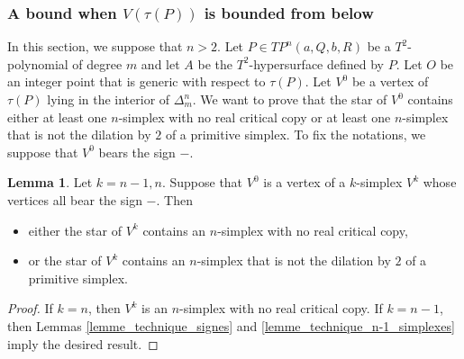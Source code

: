 \documentclass[12pt]{article}
\newcommand\customleq{\stackrel{\mathclap{\normalfont\scriptsize\mbox{n}}}{\leq}}
\theoremstyle{definition}
\newtheorem{lem}{Lemma}[section]
\newtheorem{rmk}{Remark}[section]
\begin{document}


\subsubsection{A bound when $V(\tau(P))$ is bounded from below}

\begin{sloppypar}
    In this section, we suppose that $n>2$. Let $P \in TP^n(a,Q,b,R)$ be a $T^2$-polynomial of degree $m$ and let $A$ be the $T^2$-hypersurface defined by $P$. Let $O$ be an integer point that is generic with respect to $\tau(P)$. Let $V^0$ be a vertex of $\tau(P)$ lying in the interior of $\Delta_m^n$.
    We want to prove that the star of $V^0$ contains either at least one $n$-simplex with no real critical copy or at least one $n$-simplex that is not the dilation by $2$ of a primitive simplex. To fix the notations, we suppose that $V^0$ bears the sign $-$.
\end{sloppypar}

\begin{lem}
    \label{lemme_preuve_asympto_simplexes_n-1_n}
    Let $k = n-1, n$. Suppose that $V^0$ is a vertex of a $k$-simplex $V^k$ whose vertices all bear the sign $-$. Then
    \begin{itemize}
        \item either the star of $V^k$ contains an $n$-simplex with no real critical copy,
        \item or the star of $V^k$ contains an $n$-simplex that is not the dilation by $2$ of a primitive simplex.
    \end{itemize}
\end{lem}

\begin{proof}
    If $k = n$, then $V^k$ is an $n$-simplex with no real critical copy.
    If $k = n-1$, then Lemmas \ref{lemme_technique_signes} and \ref{lemme_technique_n-1_simplexes} imply the desired result.
\end{proof}
\end{document}
